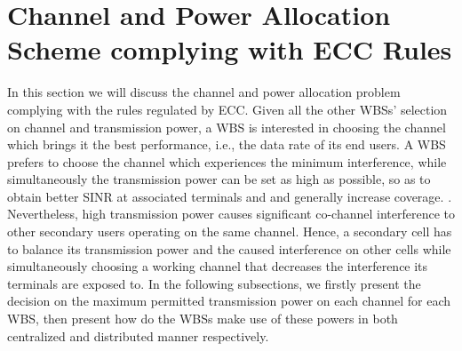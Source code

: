 \documentclass[times]{ettauth}
\newcommand{\ie}{i.e., }
\theoremstyle{mytheoremstyle}
\theoremstyle{mytheoremstyle}
\theoremstyle{mytheoremstyle}
\begin{document}


%
%

\section{Channel and Power Allocation Scheme complying with ECC Rules}

In this section we will discuss the channel and power allocation problem complying with the rules regulated by ECC.
Given all the other WBSs' selection on channel and transmission power, a WBS is interested in choosing the channel which brings it the best performance, \ie the data rate of its end users.
A WBS prefers to choose the channel which experiences the minimum interference, while simultaneously the transmission power can be set as high as possible, so as to obtain better SINR at associated terminals and and generally increase coverage. \cite{wuinfocom09, HoangPowerChannel2010}. 
Nevertheless, high transmission power causes significant co-channel interference to other secondary users operating on the same channel. 
Hence, a secondary cell has to balance its transmission power and the caused interference on other cells while simultaneously choosing a working channel that decreases the interference its terminals are exposed to.
In the following subsections, we firstly present the decision on the maximum permitted transmission power on each channel for each WBS, then present how do the WBSs make use of these powers in both centralized and distributed manner respectively.
\end{document}
